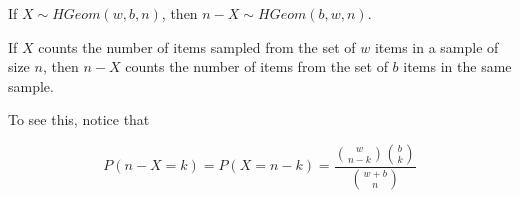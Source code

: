 If $X \sim HGeom(w, b, n)$, then $n - X \sim HGeom(b, w, n)$.

If $X$ counts the number of items sampled from the set of $w$ items in a
sample of size $n$, then $n - X$ counts the number of items from the set of $b$
items in the same sample.

To see this, notice that

$$P(n - X = k) = P(X = n - k) = \frac{\binom{w}{n-k}\binom{b}{k}}{\binom{w+b}
{n}}$$